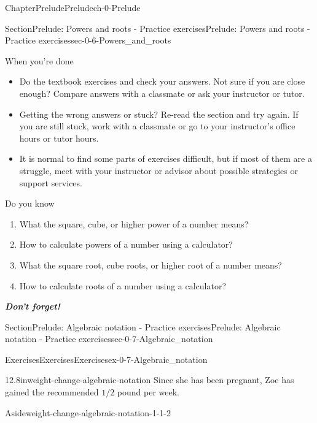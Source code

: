 \documentclass[twoside,11pt,]{book}
\newcommand{\alert}[1]{\textbf{\textit{#1}}}
\numberwithin{equation}{section}
\newcommand{\sfrac}[2]{{#1}/{#2}}
\begin{document}
\begin{chapterptx}{Chapter}{Prelude}{}{Prelude}{}{}{ch-0-Prelude}
\begin{sectionptx}{Section}{Prelude: Powers and roots - Practice exercises}{}{Prelude: Powers and roots - Practice exercises}{}{}{sec-0-6-Powers_and_roots}
\begin{conclusion}{When you're done \textellipsis{}}
\begin{itemize}[label=\textbullet]
\item{}Do the textbook exercises and check your answers. Not sure if you are close enough? Compare answers with a classmate or ask your instructor or tutor.%
\item{}Getting the wrong answers or stuck? Re-read the section and try again. If you are still stuck, work with a classmate or go to your instructor's office hours or tutor hours.%
\item{}It is normal to find some parts of exercises difficult, but if most of them are a struggle, meet with your instructor or advisor about possible strategies or support services.%
\end{itemize}
%
\end{conclusion}%
\begin{conclusion}{Do you know \textellipsis{}}%
%
\begin{enumerate}[label={\Alph*.}]
\item{}What the square, cube, or higher power of a number means?%
\item{}How to calculate powers of a number using a calculator?%
\item{}What the square root, cube roots, or higher root of a number means?%
\item{}How to calculate roots of a number using a calculator?%
\end{enumerate}
%
\par
\alert{Don't forget!}%
\end{conclusion}%
\end{sectionptx}
%
%
\typeout{************************************************}
\typeout{************************************************}
%
\begin{sectionptx}{Section}{Prelude: Algebraic notation - Practice exercises}{}{Prelude: Algebraic notation - Practice exercises}{}{}{sec-0-7-Algebraic_notation}
%
%
\typeout{************************************************}
\typeout{************************************************}
%
\begin{exercises-subsection-numberless}{Exercises}{Exercises}{}{Exercises}{}{}{ex-0-7-Algebraic_notation}
\begin{divisionexercise}{1}{}{2.8in}{weight-change-algebraic-notation}%
Since she has been pregnant, Zoe has gained the recommended \(\sfrac{1}{2}\) pound per week. \begin{aside}{Aside}{}{weight-change-algebraic-notation-1-1-2}%

\end{aside}
\end{divisionexercise}
\end{exercises-subsection-numberless}
\end{sectionptx}
\end{chapterptx}
\end{document}
